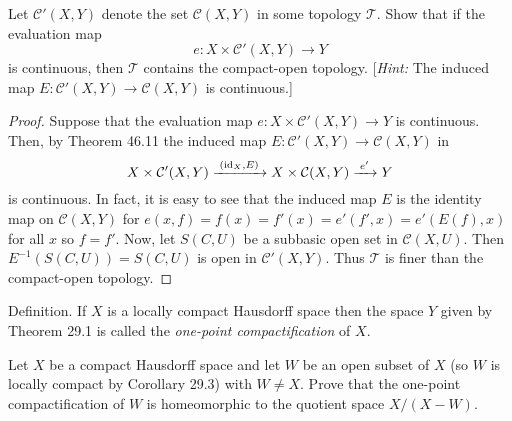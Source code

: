 \newpage
\begin{problem}[Munkres \S 46, Ex.\,8]
Let $\mathcal{C}'(X,Y)$ denote the set $\mathcal{C}(X,Y)$ in some
topology $\mathcal{T}$. Show that if the evaluation map
\[
e\colon X\times\mathcal{C}'(X,Y)\longrightarrow Y
\]
is continuous, then $\mathcal{T}$ contains the compact-open
topology. [\emph{Hint:} The induced map
$E\colon\mathcal{C}'(X,Y)\to\mathcal{C}(X,Y)$ is continuous.]
\end{problem}
\begin{proof}
Suppose that the evaluation map $e\colon
X\times\mathcal{C}'(X,Y)\longrightarrow Y$ is continuous. Then,
by Theorem 46.11 the induced map
$E\colon\mathcal{C}'(X,Y)\to\mathcal{C}(X,Y)$ in
\[
X\times\mathcal{C}'(X,Y)\xrightarrow{\;(\operatorname{id}_X,E)\;}
X\times\mathcal{C}(X,Y)\xrightarrow{\;e'\;}
Y
\]
is continuous. In fact, it is easy to see that the induced map
$E$ is the identity map on $\mathcal{C}(X,Y)$ for
$e(x,f)=f(x)=f'(x)=e'(f',x)=e'(E(f),x)$ for all $x$ so
$f=f'$. Now, let $S(C,U)$ be a subbasic open set in
$\mathcal{C}(X,U)$. Then $E^{-1}(S(C,U))=S(C,U)$ is open in
$\mathcal{C}'(X,Y)$. Thus $\mathcal{T}$ is finer than the
compact-open topology.
\end{proof}
\newpage
\begin{problem}[(A)]
\begin{definition}
Definition. If $X$ is a locally compact Hausdorff space then the
space $Y$ given by Theorem 29.1 is called the \emph{one-point
  compactification} of $X$.
\end{definition}

Let $X$ be a compact Hausdorff space and let $W$ be an open
subset of $X$ (so $W$ is locally compact by Corollary 29.3) with
$W\neq X$. Prove that the one-point compactification of $W$ is
homeomorphic to the quotient space $X/(X-W)$.
\end{problem}

